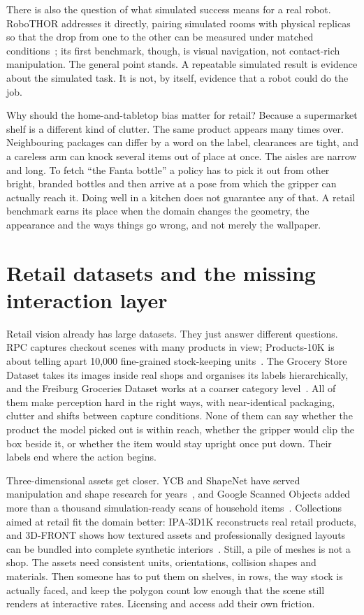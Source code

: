 There is also the question of what simulated success means for a real robot. RoboTHOR addresses it directly, pairing simulated rooms with physical replicas so that the drop from one to the other can be measured under matched conditions~\cite{deitke2020robothor}; its first benchmark, though, is visual navigation, not contact-rich manipulation. The general point stands. A repeatable simulated result is evidence about the simulated task. It is not, by itself, evidence that a robot could do the job.

Why should the home-and-tabletop bias matter for retail? Because a supermarket shelf is a different kind of clutter. The same product appears many times over. Neighbouring packages can differ by a word on the label, clearances are tight, and a careless arm can knock several items out of place at once. The aisles are narrow and long. To fetch ``the Fanta bottle'' a policy has to pick it out from other bright, branded bottles and then arrive at a pose from which the gripper can actually reach it. Doing well in a kitchen does not guarantee any of that. A retail benchmark earns its place when the domain changes the geometry, the appearance and the ways things go wrong, and not merely the wallpaper.

\section{Retail datasets and the missing interaction layer}

Retail vision already has large datasets. They just answer different questions. RPC captures checkout scenes with many products in view; Products-10K is about telling apart 10,000 fine-grained stock-keeping units~\cite{wei2019rpc,bai2020products10k}. The Grocery Store Dataset takes its images inside real shops and organises its labels hierarchically, and the Freiburg Groceries Dataset works at a coarser category level~\cite{klasson2019grocery,jund2016freiburg}. All of them make perception hard in the right ways, with near-identical packaging, clutter and shifts between capture conditions. None of them can say whether the product the model picked out is within reach, whether the gripper would clip the box beside it, or whether the item would stay upright once put down. Their labels end where the action begins.

Three-dimensional assets get closer. YCB and ShapeNet have served manipulation and shape research for years~\cite{calli2015ycb,chang2015shapenet}, and Google Scanned Objects added more than a thousand simulation-ready scans of household items~\cite{francis2022gso}. Collections aimed at retail fit the domain better: IPA-3D1K reconstructs real retail products, and 3D-FRONT shows how textured assets and professionally designed layouts can be bundled into complete synthetic interiors~\cite{lindermayr2023ipa,fu2021threeDfront}. Still, a pile of meshes is not a shop. The assets need consistent units, orientations, collision shapes and materials. Then someone has to put them on shelves, in rows, the way stock is actually faced, and keep the polygon count low enough that the scene still renders at interactive rates. Licensing and access add their own friction.

